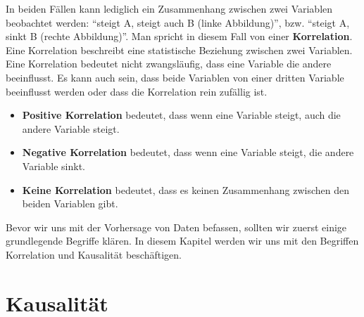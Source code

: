 In beiden Fällen kann lediglich ein Zusammenhang zwischen zwei Variablen beobachtet werden: \enquote{steigt A, steigt auch B (linke Abbildung)}, bzw. \enquote{steigt A, sinkt B (rechte Abbildung)}. Man spricht in diesem Fall von einer \textbf{Korrelation}. Eine Korrelation beschreibt eine statistische Beziehung zwischen zwei Variablen. Eine Korrelation bedeutet nicht zwangsläufig, dass eine Variable die andere beeinflusst. Es kann auch sein, dass beide Variablen von einer dritten Variable beeinflusst werden oder dass die Korrelation rein zufällig ist.
\begin{itemize}
    \item \textbf{Positive Korrelation} bedeutet, dass wenn eine Variable steigt, auch die andere Variable steigt.
    \item \textbf{Negative Korrelation} bedeutet, dass wenn eine Variable steigt, die andere Variable sinkt.
    \item \textbf{Keine Korrelation} bedeutet, dass es keinen Zusammenhang zwischen den beiden Variablen gibt.
\end{itemize}

Bevor wir uns mit der Vorhersage von Daten befassen, sollten wir zuerst einige grundlegende Begriffe klären. In diesem Kapitel werden wir uns mit den Begriffen Korrelation und Kausalität beschäftigen.

\section{Kausalität}

